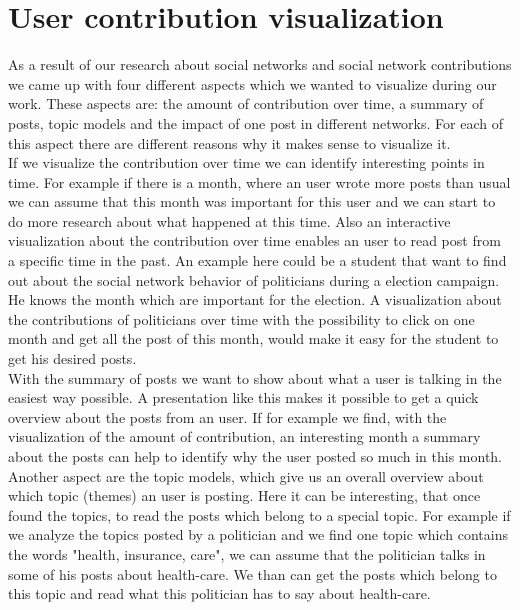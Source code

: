 \section{User contribution visualization}\label{sec:uservisualization} 

As a result of our research about social networks and social network contributions we came up with four different aspects which we wanted to visualize during our work. These aspects are: the amount of contribution over time, a summary of posts, topic models and the impact of one post in different networks. For each of this aspect there are different reasons why it makes sense to visualize it. \\
If we visualize the contribution over time we can identify interesting points in time. For example if there is a month, where an user wrote more posts than usual we can assume that this month was important for this user and we can start to do more research about what happened at this time. Also an interactive visualization about the contribution over time enables an user to read post from a specific time in the past. An example here could be  a student that want to find out about the social network behavior of politicians during a election campaign. He knows the month which are important for the election. A visualization about the contributions of politicians over time with the possibility to click on one month and get all the post of this month, would make it easy for the student to get his desired posts. \\
With the summary of posts we want to show about what a user is talking in the easiest way possible. A presentation like this makes it possible  to get a quick overview about the posts from an user. If for example we find, with the visualization of the amount of contribution, an interesting month  a summary about the posts can help to identify why the user posted so much in this month. \\
Another aspect are the topic models, which give us an overall overview about which topic (themes) an user is posting. Here it can be interesting, that once found the topics, to read the posts which belong to a special topic. For example if we analyze the topics posted by a politician and we find one topic which contains the words "health, insurance, care", we can assume that the politician talks  in some of his posts about health-care. We than can get the posts which belong to  this topic and read what this politician has to say about  health-care. \\
